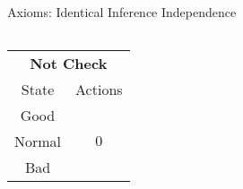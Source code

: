\documentclass[usenames,dvipsnames,aspectratio=169,11pt, envcountsect, handout]{beamer}
\begin{document}
\begin{frame}{Axioms: Identical Inference Independence}
\begin{table}[H]
\begin{minipage}{0.29\textwidth}
\begin{tabular}{c | c}
			\end{tabular}
			\vspace{0.5cm} %
		\end{minipage}\hspace{0.5cm} %
		\begin{minipage}{0.29\textwidth}
			\centering
			\begin{tabular}{c | c}
				\multicolumn{2}{c}{\textbf{Not Check}} \\
				State  & Actions                       \\
				\hline
				Good   & \multirow{3}{*}{ \( 0 \)}     \\
				Normal &                               \\
				Bad    &                               \\
			\end{tabular}
			\vspace{0.5cm} %
		\end{minipage}
	\end{table}

	\begin{flushright}
		\hyperlink{independenceapp}{}
	\end{flushright}

\end{frame}
\end{document}
